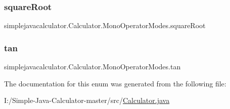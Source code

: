 \subsubsection{\texorpdfstring{squareRoot}{squareRoot}}
{\footnotesize\ttfamily simplejavacalculator.\+Calculator.\+Mono\+Operator\+Modes.\+square\+Root}

\mbox{\label{enumsimplejavacalculator_1_1_calculator_1_1_mono_operator_modes_a718972148e1a4f7aa667c0b422321f03}} 
\subsubsection{\texorpdfstring{tan}{tan}}
{\footnotesize\ttfamily simplejavacalculator.\+Calculator.\+Mono\+Operator\+Modes.\+tan}



The documentation for this enum was generated from the following file\+:\begin{DoxyCompactItemize}
\item 
I\+:/\+Simple-\/\+Java-\/\+Calculator-\/master/src/\mbox{\hyperlink{_calculator_8java}{Calculator.\+java}}\end{DoxyCompactItemize}
